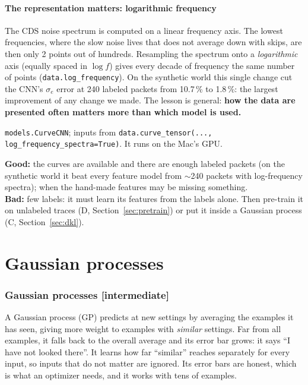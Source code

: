 \documentclass[11pt]{article}
\newcommand{\code}[1]{\texttt{#1}}
\newcommand{\level}[1]{\hfill{\normalfont\small\color{black!60}[#1]}}
\begin{document}
\subsection{The representation matters: logarithmic frequency}
The CDS noise spectrum is computed on a linear frequency axis. The lowest frequencies, where the slow noise lives that does not
average down with skips, are then only 2 points out of hundreds. Resampling the spectrum onto a \emph{logarithmic} axis (equally
spaced in $\log f$) gives every decade of frequency the same number of points (\code{data.log\_frequency}). On the synthetic world
this single change cut the CNN's $\sigma_e$ error at 240 labeled packets from 10.7\,\% to 1.8\,\%: the largest improvement of any
change we made. The lesson is general: \textbf{how the data are presented often matters more than which model is used.}

\begin{ours}
\code{models.CurveCNN}; inputs from \code{data.curve\_tensor(..., log\_frequency\_spectra=True)}. It runs on the Mac's GPU.
\end{ours}

\begin{when}
\textbf{Good:} the curves are available and there are enough labeled packets (on the synthetic world it beat every feature model
from $\sim$240 packets with log-frequency spectra); when the hand-made features may be missing something.\\
\textbf{Bad:} few labels: it must learn its features from the labels alone. Then pre-train it on unlabeled traces (D,
Section~\ref{sec:pretrain}) or put it inside a Gaussian process (C, Section~\ref{sec:dkl}).
\end{when}

\part{Gaussian processes}

\section{Gaussian processes \level{intermediate}}
\label{sec:gp}

\begin{idea}
A Gaussian process (GP) predicts at new settings by averaging the examples it has seen, giving more weight to examples with
\emph{similar} settings. Far from all examples, it falls back to the overall average and its error bar grows: it says ``I have not
looked there''. It learns how far ``similar'' reaches separately for every input, so inputs that do not matter are ignored. Its error
bars are honest, which is what an optimizer needs, and it works with tens of examples.
\end{idea}
\end{document}
